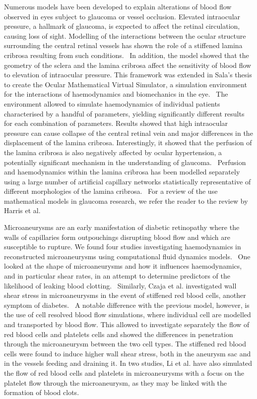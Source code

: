\documentclass[12pt,a4paper]{journal}
\begin{document}
Numerous models have been developed to explain alterations of blood flow observed in eyes subject to glaucoma or vessel occlusion.\cite{Chuangsuwanich_2016,Guidoboni_2014,Sala_2018,Sala_2020}
Elevated intraocular pressure, a hallmark of glaucoma, is expected to affect the retinal circulation, causing loss of sight.
Modelling of the interactions between the ocular structure surrounding the central retinal vessels has shown the role of a stiffened lamina cribrosa resulting from such conditions.~\cite{Guidoboni_2014}
In addition, the model showed that the geometry of the sclera and the lamina cribrosa affect the sensitivity of blood flow to elevation of intraocular pressure.
This framework was extended in Sala's thesis to create the Ocular Mathematical Virtual Simulator, a simulation environment for the interactions of haemodynamics and biomechanics in the eye.~\cite{Sala_2018,Sala_2020}
The environment allowed to simulate haemodynamics of individual patients characterised by a handful of parameters, yielding significantly different results for each combination of parameters.
Results showed that high intraocular pressure can cause collapse of the central retinal vein and major differences in the displacement of the lamina cribrosa.
Interestingly, it showed that the perfusion of the lamina cribrosa is also negatively affected by ocular hypertension, a potentially significant mechanism in the understanding of glaucoma.~\cite{Sala_2020}
Perfusion and haemodynamics within the lamina cribrosa has been modelled separately using a large number of artificial capillary networks statistically representative of different morphologies of the lamina cribrosa.~\cite{Chuangsuwanich_2016}
For a review of the use mathematical models in glaucoma research, we refer the reader to the review by Harris et al.~\cite{Harris_2013}


Microaneurysms are an early manifestation of diabetic retinopathy where the walls of capillaries form outpouchings disrupting blood flow and which are susceptible to rupture.
We found four studies investigating haemodynamics in reconstructed microaneurysms using computational fluid dynamics models.~\cite{Bernabeu_2018,Czaja_2022,Li_2020,Li_2022}
One looked at the shape of microaneurysms and how it influences haemodynamics, and in particular shear rates, in an attempt to determine predictors of the likelihood of leaking blood clotting.~\cite{Bernabeu_2018}
Similarly, Czaja et al. investigated wall shear stress in microaneurysms in the event of stiffened red blood cells, another symptom of diabetes.~\cite{Czaja_2022}
A notable difference with the previous model, however, is the use of cell resolved blood flow simulations, where individual cell are modelled and transported by blood flow.
This allowed to investigate separately the flow of red blood cells and platelets cells and showed the differences in penetration through the microaneurysm between the two cell types.
The stiffened red blood cells were found to induce higher wall shear stress, both in the aneurysm sac and in the vessels feeding and draining it.
In two studies, Li et al. have also simulated the flow of red blood cells and platelets in microaneurysms with a focus on the platelet flow through the microaneurysm, as they may be linked with the formation of blood clots.~\cite{Li_2020,Li_2022}
\end{document}
